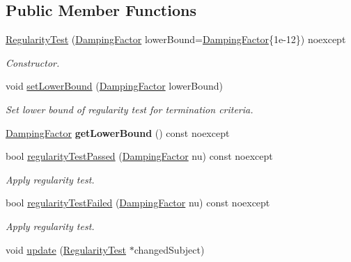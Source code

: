 \subsection*{Public Member Functions}
\begin{DoxyCompactItemize}
\item 
\hyperlink{classSpacy_1_1Mixin_1_1RegularityTest_a548d9d45c31c7833266bd3b20dc1aa7e}{Regularity\-Test} (\hyperlink{classSpacy_1_1DampingFactor}{Damping\-Factor} lower\-Bound=\hyperlink{classSpacy_1_1DampingFactor}{Damping\-Factor}\{1e-\/12\}) noexcept
\begin{DoxyCompactList}\small\item\em Constructor. \end{DoxyCompactList}\item 
\hypertarget{classSpacy_1_1Mixin_1_1RegularityTest_a682ce022b0b5493e48f50f693ed64082}{void \hyperlink{classSpacy_1_1Mixin_1_1RegularityTest_a682ce022b0b5493e48f50f693ed64082}{set\-Lower\-Bound} (\hyperlink{classSpacy_1_1DampingFactor}{Damping\-Factor} lower\-Bound)}\label{classSpacy_1_1Mixin_1_1RegularityTest_a682ce022b0b5493e48f50f693ed64082}

\begin{DoxyCompactList}\small\item\em Set lower bound of regularity test for termination criteria. \end{DoxyCompactList}\item 
\hypertarget{classSpacy_1_1Mixin_1_1RegularityTest_a576995201badbfaee2064bf0d7749257}{\hyperlink{classSpacy_1_1DampingFactor}{Damping\-Factor} {\bfseries get\-Lower\-Bound} () const noexcept}\label{classSpacy_1_1Mixin_1_1RegularityTest_a576995201badbfaee2064bf0d7749257}

\item 
bool \hyperlink{classSpacy_1_1Mixin_1_1RegularityTest_acb6b3e8c76ebdbded0ec610959513caf}{regularity\-Test\-Passed} (\hyperlink{classSpacy_1_1DampingFactor}{Damping\-Factor} nu) const noexcept
\begin{DoxyCompactList}\small\item\em Apply regularity test. \end{DoxyCompactList}\item 
bool \hyperlink{classSpacy_1_1Mixin_1_1RegularityTest_aeb1a3b051bafc9da9be1df354c652812}{regularity\-Test\-Failed} (\hyperlink{classSpacy_1_1DampingFactor}{Damping\-Factor} nu) const noexcept
\begin{DoxyCompactList}\small\item\em Apply regularity test. \end{DoxyCompactList}\item 
\hypertarget{classSpacy_1_1Mixin_1_1RegularityTest_a1a6191e20f84025cec8b10ec63ab94ac}{void \hyperlink{classSpacy_1_1Mixin_1_1RegularityTest_a1a6191e20f84025cec8b10ec63ab94ac}{update} (\hyperlink{classSpacy_1_1Mixin_1_1RegularityTest}{Regularity\-Test} $\ast$changed\-Subject)}\label{classSpacy_1_1Mixin_1_1RegularityTest_a1a6191e20f84025cec8b10ec63ab94ac}


\end{DoxyCompactItemize}
